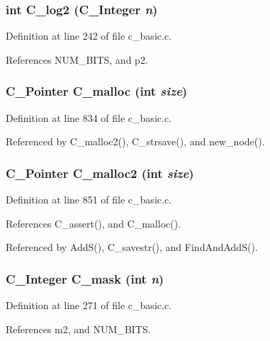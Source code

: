 \subsubsection{\setlength{\rightskip}{0pt plus 5cm}int C\_\-log2 (\bf{C\_\-Integer} {\em n})}\label{c__basic_8c_b0494661b08b6670839d5b02d4d7cee9}




Definition at line 242 of file c\_\-basic.c.

References NUM\_\-BITS, and p2.
\subsubsection{\setlength{\rightskip}{0pt plus 5cm}\bf{C\_\-Pointer} C\_\-malloc (int {\em size})}\label{c__basic_8c_8d95f5c50cd92a949156472463d1e7f6}




Definition at line 834 of file c\_\-basic.c.

Referenced by C\_\-malloc2(), C\_\-strsave(), and new\_\-node().
\subsubsection{\setlength{\rightskip}{0pt plus 5cm}\bf{C\_\-Pointer} C\_\-malloc2 (int {\em size})}\label{c__basic_8c_4e6901a0bdbd2271b25bee7ca33f5e0b}




Definition at line 851 of file c\_\-basic.c.

References C\_\-assert(), and C\_\-malloc().

Referenced by Add\-S(), C\_\-savestr(), and Find\-And\-Add\-S().
\subsubsection{\setlength{\rightskip}{0pt plus 5cm}\bf{C\_\-Integer} C\_\-mask (int {\em n})}\label{c__basic_8c_8b483c3d7ae7f6f18e7d4340ac2f10e5}




Definition at line 271 of file c\_\-basic.c.

References m2, and NUM\_\-BITS.
